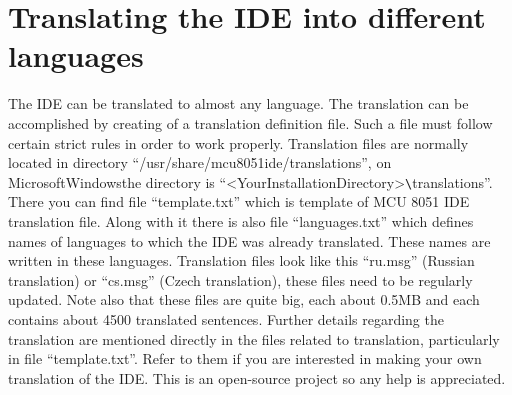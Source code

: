 \documentclass[a4paper,twoside,12pt]{book}
\begin{document}
\chapter{Translating the IDE into different languages}
	The IDE can be translated to almost any language. The translation can be accomplished by creating of a translation definition file. Such a file must follow certain strict rules in order to work properly. Translation files are normally located in directory ``/usr/share/mcu8051ide/translations'', on Microsoft\textregistered Windows\textregistered the directory is ``<YourInstallationDirectory>\verb'\'translations''. There you can find file ``template.txt'' which is template of MCU 8051 IDE translation file. Along with it there is also file ``languages.txt'' which defines names of languages to which the IDE was already translated. These names are written in these languages. Translation files look like this ``ru.msg'' (Russian translation) or ``cs.msg'' (Czech translation), these files need to be regularly updated. Note also that these files are quite big, each about 0.5MB and each contains about 4500 translated sentences. Further details regarding the translation are mentioned directly in the files related to translation, particularly in file ``template.txt''. Refer to them if you are interested in making your own translation of the IDE. This is an open-source project so any help is appreciated.
\end{document}
